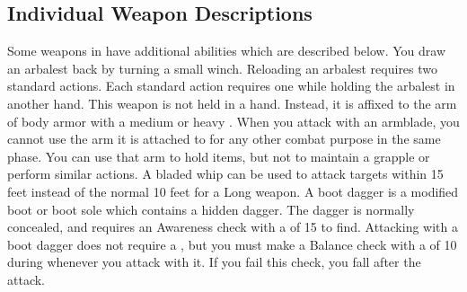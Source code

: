   \subsection{Individual Weapon Descriptions}
    Some weapons in  have additional abilities which are described below.
     You draw an arbalest back by turning a small winch. Reloading an arbalest requires two standard actions.
    Each standard action requires one  while holding the arbalest in another hand.
     This weapon is not held in a hand.
    Instead, it is affixed to the arm of body armor with a medium or heavy .
    When you attack with an armblade, you cannot use the arm it is attached to for any other combat purpose in the same phase.
    You can use that arm to hold items, but not to maintain a grapple or perform similar actions.
     A bladed whip can be used to attack targets within 15 feet instead of the normal 10 feet for a Long weapon.
     A boot dagger is a modified boot or boot sole which contains a hidden dagger.
    The dagger is normally concealed, and requires an Awareness check with a  of 15 to find.
    Attacking with a boot dagger does not require a , but you must make a Balance check with a  of 10 during whenever you attack with it.
    If you fail this check, you fall \prone after the attack.

